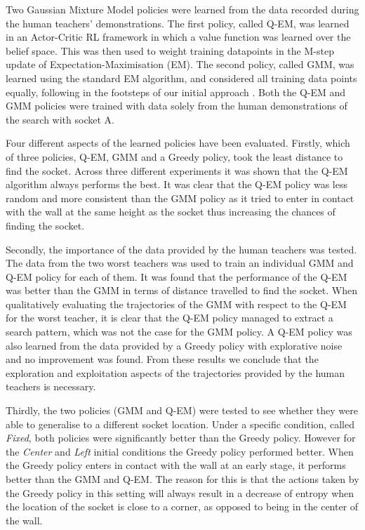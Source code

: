 \documentclass[final,5p,times,twocolumn]{elsarticle}
\begin{document}
Two Gaussian Mixture Model policies were learned from the data recorded during the human teachers' demonstrations. 
The first policy, called Q-EM, was learned in an Actor-Critic RL framework in which a value function was learned over 
the belief space. This was then used to weight training datapoints in the M-step update of Expectation-Maximisation (EM). The second 
policy, called GMM, was learned using the standard EM algorithm, and considered all training data points equally,
following in the footsteps of our initial approach \cite{Chambrier2014}. Both the Q-EM and GMM policies were trained 
with data solely from the human demonstrations of the search with socket A.

Four different aspects of the learned policies have been evaluated. Firstly, which of three policies, Q-EM, GMM and a Greedy policy, 
took the least distance to find the socket. Across three different experiments it was shown that the Q-EM algorithm always performs
the best. It was clear that the Q-EM policy was less random and more consistent than the GMM policy as it tried to enter in 
contact with the wall at the same height as the socket thus increasing the chances of finding the socket.

Secondly, the importance of the data provided by the human teachers was tested. The data from the two worst teachers was used to 
train an individual GMM and Q-EM policy for each of them. It was found that the performance of the Q-EM was better than the GMM in terms 
of distance travelled to find the socket. When qualitatively evaluating the trajectories of the GMM with respect to the 
Q-EM for the worst teacher, it is clear that the Q-EM policy managed to extract a search pattern, which was not the case 
for the GMM policy. A Q-EM policy was also learned from the data provided by a Greedy policy with explorative noise 
and no improvement was found. From these results we conclude that the exploration and exploitation aspects of the trajectories 
provided by the human teachers is necessary.

Thirdly, the two policies (GMM and Q-EM) were tested to see whether they were able to generalise to a different socket location. 
Under a specific condition, called \textit{Fixed}, both policies were significantly better than the Greedy policy. However for the \textit{Center}
and \textit{Left} initial conditions the Greedy policy performed better. When the Greedy policy 
enters in contact with the wall at an early stage, it performs better than the GMM and Q-EM. The reason for this is that  
the actions taken by the Greedy policy in this setting will always result in a decrease of entropy when the location
of the socket is close to a corner, as opposed to being in the center of the wall.
\end{document}
